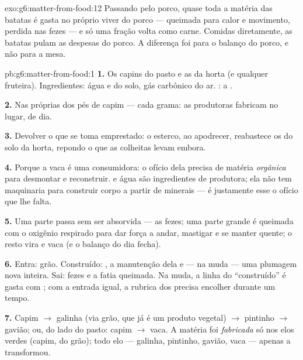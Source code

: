 \begin{solution}{exo:g6:matter-from-food:12}
Passando pelo porco, quase toda a matéria das batatas é gasta no
próprio viver do porco --- queimada para calor e movimento, perdida
nas fezes --- e só uma fração volta como carne. Comidas diretamente,
as batatas pulam as despesas do porco. A diferença foi para o balanço
do porco, e não para a mesa.
\end{solution}

\begin{solution}{pb:g6:matter-from-food:1}
\textbf{1.} Os capins do pasto e as  da horta (e qualquer
fruteira). Ingredientes: água e  do solo, gás carbônico
do ar. : a .

\textbf{2.} Nas próprias  dos pés de capim --- cada grama: as
produtoras fabricam no lugar, de dia.

\textbf{3.} Devolver o que se toma emprestado: o esterco, ao
apodrecer, reabastece os  do solo da horta, repondo o
que as colheitas levam embora.

\textbf{4.} Porque a vaca é uma consumidora: o ofício dela precisa de
matéria \emph{orgânica} para desmontar e reconstruir.  e
água são ingredientes de produtora; ela não tem maquinaria para
construir corpo a partir de minerais --- é justamente esse o ofício
que lhe falta.

\textbf{5.} Uma parte passa sem ser absorvida --- as fezes; uma parte
grande é queimada com o oxigênio respirado para dar força a andar,
mastigar e se manter quente; o resto vira  e vaca (e o balanço
do dia fecha).

\textbf{6.} Entra: grão. Construído: , a manutenção dela e ---
na muda --- uma plumagem nova inteira. Sai: fezes e a fatia queimada.
Na muda, a linha do ``construído'' é gasta com ; com a entrada
igual, a rubrica dos  precisa encolher durante um tempo.

\textbf{7.} Capim $\rightarrow$ galinha (via grão, que já é um produto
vegetal) $\rightarrow$ pintinho $\rightarrow$ gavião; ou, do lado do
pasto: capim $\rightarrow$ vaca. A matéria foi \emph{fabricada} só nos
elos verdes (capim,  do grão); todo elo  --- galinha,
pintinho, gavião, vaca --- apenas a transformou.


\end{solution}
